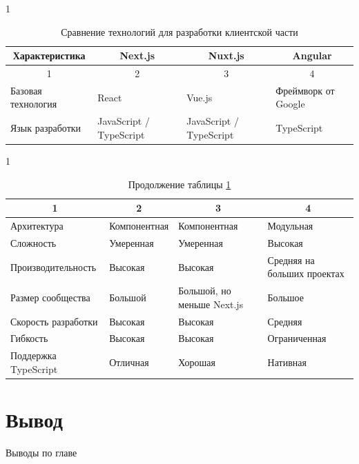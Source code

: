 \begin{table}[H]
  \caption{Сравнение технологий для разработки клиентской части}
  \label{tab:client}
  \begingroup
    \begin{spacing}{1} %
      \begin{tabular}{|p{4.5cm}|p{3cm}|p{3cm}|p{4cm}|}
        \hline
        \multicolumn{1}{|c}{Характеристика}       & \multicolumn{1}{|c}{Next.js}                 & \multicolumn{1}{|c|}{Nuxt.js}                    & \multicolumn{1}{c|}{Angular}   \\ \hline
        \multicolumn{1}{|c}{1}       & \multicolumn{1}{|c}{2}                 & \multicolumn{1}{|c|}{3}                    & \multicolumn{1}{c|}{4} \\ \hline
        Базовая технология   & React                   & Vue.js                     & Фреймворк от Google         \\ \hline
        Язык разработки      & JavaScript / TypeScript & JavaScript / TypeScript    & TypeScript                  \\ \hline
      \end{tabular}
    \end{spacing}
  \endgroup
\end{table}

\begin{table}[H]
  \caption*{Продолжение таблицы \ref{tab:client}}
  \begingroup
    \begin{spacing}{1} %
      \begin{tabular}{|p{4.5cm}|p{3cm}|p{3cm}|p{4cm}|}
        \hline
        \multicolumn{1}{|c}{1}       & \multicolumn{1}{|c}{2}                 & \multicolumn{1}{|c|}{3}                    & \multicolumn{1}{c|}{4} \\ \hline
        Архитектура          & Компонентная            & Компонентная               & Модульная                   \\ \hline
        Сложность            & Умеренная               & Умеренная                  & Высокая                     \\ \hline
        Производительность   & Высокая                 & Высокая                    & Средняя на больших проектах \\ \hline
        Размер сообщества    & Большой                 & Большой, но меньше Next.js & Большое                     \\ \hline
        Скорость разработки  & Высокая                 & Высокая                    & Средняя                     \\ \hline
        Гибкость             & Высокая                 & Высокая                    & Ограниченная                \\ \hline
        Поддержка TypeScript & Отличная                & Хорошая                    & Нативная                    \\ \hline
      \end{tabular}
    \end{spacing}
  \endgroup
\end{table}
\vspace{10pt}

\section{Вывод}

Выводы по главе